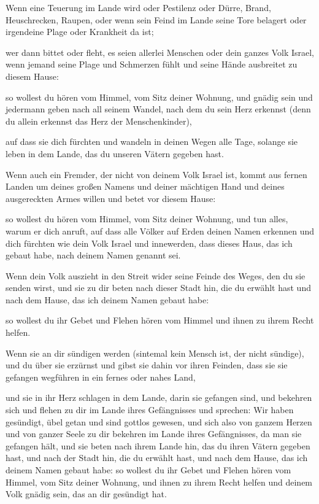  Wenn eine Teuerung im Lande wird oder Pestilenz oder
Dürre, Brand, Heuschrecken, Raupen, oder wenn sein Feind im Lande seine
Tore belagert oder irgendeine Plage oder Krankheit da ist;

 wer dann bittet oder fleht, es seien allerlei Menschen
oder dein ganzes Volk Israel, wenn jemand seine Plage und Schmerzen
fühlt und seine Hände ausbreitet zu diesem Hause:

 so wollest du hören vom Himmel, vom Sitz deiner Wohnung,
und gnädig sein und jedermann geben nach all seinem Wandel, nach dem du
sein Herz erkennst (denn du allein erkennst das Herz der
Menschenkinder),

 auf dass sie dich fürchten und wandeln in deinen Wegen
alle Tage, solange sie leben in dem Lande, das du unseren Vätern gegeben
hast.

 Wenn auch ein Fremder, der nicht von deinem Volk Israel
ist, kommt aus fernen Landen um deines großen Namens und deiner
mächtigen Hand und deines ausgereckten Armes willen und betet vor diesem
Hause:

 so wollest du hören vom Himmel, vom Sitz deiner Wohnung,
und tun alles, warum er dich anruft, auf dass alle Völker auf Erden
deinen Namen erkennen und dich fürchten wie dein Volk Israel und
innewerden, dass dieses Haus, das ich gebaut habe, nach deinem Namen
genannt sei.

 Wenn dein Volk auszieht in den Streit wider seine Feinde
des Weges, den du sie senden wirst, und sie zu dir beten nach dieser
Stadt hin, die du erwählt hast und nach dem Hause, das ich deinem Namen
gebaut habe:

 so wollest du ihr Gebet und Flehen hören vom Himmel und
ihnen zu ihrem Recht helfen.

 Wenn sie an dir sündigen werden (sintemal kein Mensch
ist, der nicht sündige), und du über sie erzürnst und gibst sie dahin
vor ihren Feinden, dass sie sie gefangen wegführen in ein fernes oder
nahes Land,

 und sie in ihr Herz schlagen in dem Lande, darin sie
gefangen sind, und bekehren sich und flehen zu dir im Lande ihres
Gefängnisses und sprechen: Wir haben gesündigt, übel getan und sind
gottlos gewesen,  und sich also von ganzem Herzen und von
ganzer Seele zu dir bekehren im Lande ihres Gefängnisses, da man sie
gefangen hält, und sie beten nach ihrem Lande hin, das du ihren Vätern
gegeben hast, und nach der Stadt hin, die du erwählt hast, und nach dem
Hause, das ich deinem Namen gebaut habe:  so wollest du
ihr Gebet und Flehen hören vom Himmel, vom Sitz deiner Wohnung, und
ihnen zu ihrem Recht helfen und deinem Volk gnädig sein, das an dir
gesündigt hat.

